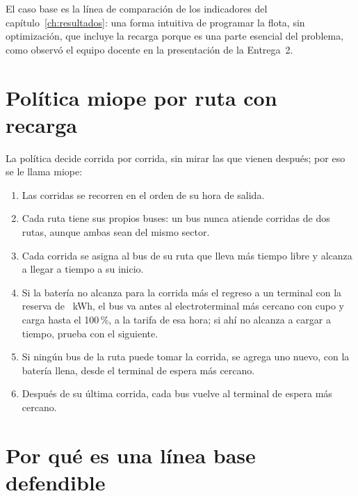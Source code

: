 
El caso base es la línea de comparación de los indicadores del capítulo~\ref{ch:resultados}: una forma intuitiva de programar la flota, sin optimización, que incluye la recarga porque es una parte esencial del problema, como observó el equipo docente en la presentación de la Entrega~2.

\section{Política miope por ruta con recarga}
\label{sec:politica-miope}

La política decide corrida por corrida, sin mirar las que vienen después; por eso se le llama miope:

\begin{enumerate}
\item Las corridas se recorren en el orden de su hora de salida.
\item Cada ruta tiene sus propios buses: un bus nunca atiende corridas de dos rutas, aunque ambas sean del mismo sector.
\item Cada corrida se asigna al bus de su ruta que lleva más tiempo libre y alcanza a llegar a tiempo a su inicio.
\item Si la batería no alcanza para la corrida más el regreso a un terminal con la reserva de \Reserva~kWh, el bus va antes al electroterminal más cercano con cupo y carga hasta el 100\,\%, a la tarifa de esa hora; si ahí no alcanza a cargar a tiempo, prueba con el siguiente.
\item Si ningún bus de la ruta puede tomar la corrida, se agrega uno nuevo, con la batería llena, desde el terminal de espera más cercano.
\item Después de su última corrida, cada bus vuelve al terminal de espera más cercano.
\end{enumerate}

\section{Por qué es una línea base defendible}
\label{sec:caso-base-defendible}

